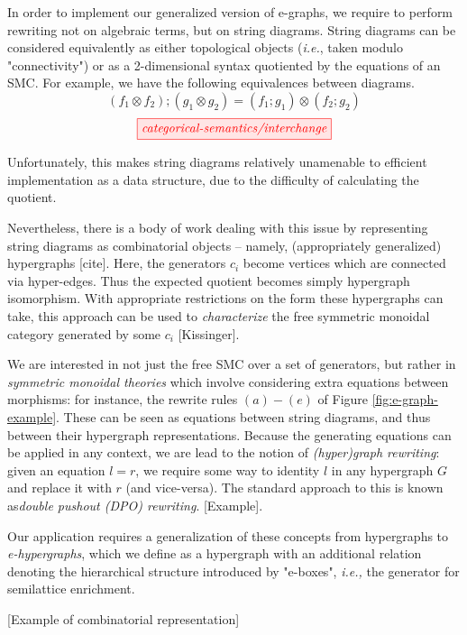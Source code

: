In order to implement our generalized version of e-graphs, we require to perform rewriting not on algebraic terms, but on string diagrams. String diagrams can be considered equivalently as either topological objects (\textit{i.e.}, taken modulo "connectivity") or as a 2-dimensional syntax quotiented by the equations of an SMC. For example, we have the following equivalences between diagrams. 
\[(f_1 \otimes f_2) ; (g_1 \otimes g_2) = (f_1 ; g_1) \otimes (f_2 ; g_2)\] 
\[
	\tikzfig{categorical-semantics/interchange}
\]

Unfortunately, this makes string diagrams relatively unamenable to efficient implementation as a data structure, due to the difficulty of calculating the quotient. 

Nevertheless, there is a body of work dealing with this issue by representing string diagrams as combinatorial objects -- namely, (appropriately generalized) hypergraphs [cite]. Here, the generators $c_i$ become vertices which are connected via hyper-edges. Thus the expected quotient becomes simply hypergraph isomorphism. With appropriate restrictions on the form these hypergraphs can take, this approach can be used to \textit{characterize} the free symmetric monoidal category generated by some $c_i$ [Kissinger]. 

We are interested in not just the free SMC over a set of generators, but rather in \textit{symmetric monoidal theories} which involve considering extra equations between morphisms: for instance, the rewrite rules $(a)-(e)$ of Figure \ref{fig:e-graph-example}. These can be seen as equations between string diagrams, and thus between their hypergraph representations. Because the generating equations can be applied in any context, we are lead to the notion of \textit{(hyper)graph rewriting}: given an equation $l=r$, we require some way to identity $l$ in any hypergraph $G$ and replace it with $r$ (and vice-versa). 
The standard approach to this is known as\textit{double pushout (DPO) rewriting}. [Example]. 

Our application requires a generalization of these concepts from hypergraphs to \textit{e-hypergraphs}, which we define as a hypergraph with an additional relation denoting the hierarchical structure introduced by "e-boxes", \textit{i.e.,} the generator for semilattice enrichment. 

[Example of combinatorial representation]

